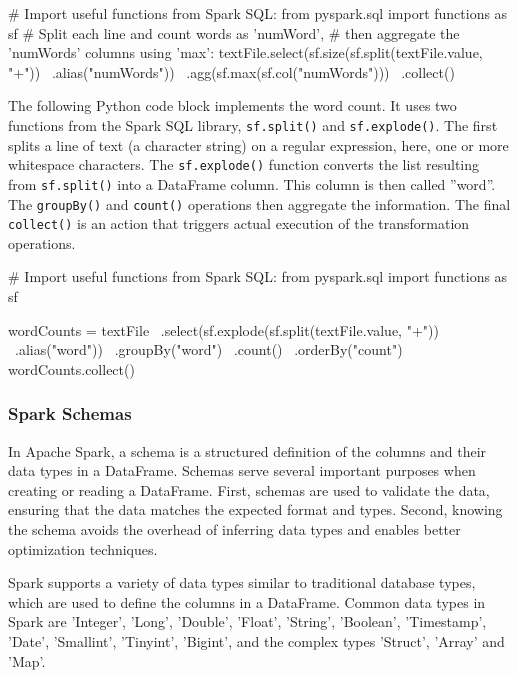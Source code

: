 \begin{pythoncode}
# Import useful functions from Spark SQL:
from pyspark.sql import functions as sf
# Split each line and count words as 'numWord', 
# then aggregate the 'numWords' columns using 'max':
textFile.select(sf.size(sf.split(textFile.value, "\s+")) \
    .alias("numWords")) \
    .agg(sf.max(sf.col("numWords"))) \
    .collect()
\end{pythoncode}

The following Python code block implements the word count. It uses two functions from the Spark SQL library, \texttt{sf.split()} and \texttt{sf.explode()}. The first splits a line of text (a character string) on a regular expression, here, one or more whitespace characters. The \texttt{sf.explode()} function converts the list resulting from \texttt{sf.split()} into a DataFrame column. This column is then called ''word''. The \texttt{groupBy()} and \texttt{count()} operations then aggregate the information. The final \texttt{collect()} is an action that triggers actual execution of the transformation operations.

\begin{pythoncode}
# Import useful functions from Spark SQL:
from pyspark.sql import functions as sf

wordCounts = textFile \
    .select(sf.explode(sf.split(textFile.value, "\s+")) \
    .alias("word")) \
    .groupBy("word") \
    .count() \
    .orderBy("count")
wordCounts.collect()
\end{pythoncode}

\subsubsection*{Spark Schemas}

In Apache Spark, a schema is a structured definition of the columns and their data types in a DataFrame. Schemas serve several important purposes when creating or reading a DataFrame. First, schemas are used to validate the data, ensuring that the data matches the expected format and types. Second, knowing the schema avoids the overhead of inferring data types and enables better optimization techniques. 

Spark supports a variety of data types similar to traditional database types, which are used to define the columns in a DataFrame. Common data types in Spark are 'Integer', 'Long', 'Double', 'Float', 'String', 'Boolean', 'Timestamp', 'Date', 'Smallint', 'Tinyint', 'Bigint', and the complex types 'Struct', 'Array' and 'Map'.

